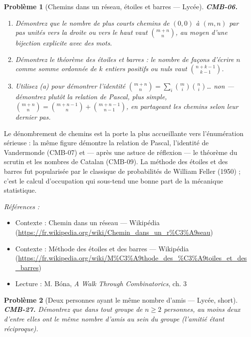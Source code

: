 \documentclass[11pt]{article}
\newtheorem{problem}{Problème}
\newenvironment{refs}{\par\small\noindent\emph{Références :}\begin{itemize}\setlength\itemsep{0pt}}{\end{itemize}\normalsize}
\begin{document}
\bigskip

\begin{problem}[{Chemins dans un réseau, étoiles et barres --- Lycée}]
\textbf{CMB-06.} \begin{enumerate}
\item[(a)] Démontrez que le nombre de plus courts chemins de $ (0,0) $ à $ (m,n) $ par pas unités
vers la droite ou vers le haut vaut $ \binom{m+n}{n} $, au moyen d'une bijection explicite avec
des mots.
\item[(b)] Démontrez le théorème des \og{} étoiles et barres \fg{} : le nombre de façons d'écrire $ n $ comme
somme ordonnée de $ k $ entiers positifs ou nuls vaut $ \binom{n+k-1}{k-1} $.
\item[(c)] Utilisez (a) pour démontrer l'identité $ \binom{m+n}{n} = \sum_i \binom{m}{i}\binom{n}{i} $\dots{}
non --- démontrez plutôt la relation de Pascal, plus simple,
$ \binom{m+n}{n} = \binom{m+n-1}{n} + \binom{m+n-1}{n-1} $, en partageant les chemins selon leur
dernier pas.
\end{enumerate}

\end{problem}

\noindent Le dénombrement de chemins est la porte la plus accueillante vers
l'énumération sérieuse : la même figure démontre la relation de Pascal, l'identité de Vandermonde
(CMB-07) et --- après une astuce de réflexion --- le théorème du scrutin et les nombres de Catalan
(CMB-09). La méthode des étoiles et des barres fut popularisée par le classique de probabilités
de William Feller (1950) ; c'est le calcul d'occupation qui sous-tend une bonne part de la
mécanique statistique.

\begin{refs}
\item Contexte : Chemin dans un réseau --- Wikipédia (\url{https://fr.wikipedia.org/wiki/Chemin_dans_un_r%C3%A9seau})
\item Contexte : Méthode des étoiles et des barres --- Wikipédia (\url{https://fr.wikipedia.org/wiki/M%C3%A9thode_des_%C3%A9toiles_et_des_barres})
\item Lecture : M. Bóna, \textit{A Walk Through Combinatorics}, ch. 3
\end{refs}

\bigskip

\begin{problem}[{Deux personnes ayant le même nombre d'amis --- Lycée, short}]
\textbf{CMB-27.} Démontrez que dans tout groupe de $ n \geq 2 $ personnes, au moins deux d'entre elles ont le même nombre d'amis au sein du groupe (l'amitié étant réciproque).
\end{problem}
\end{document}
